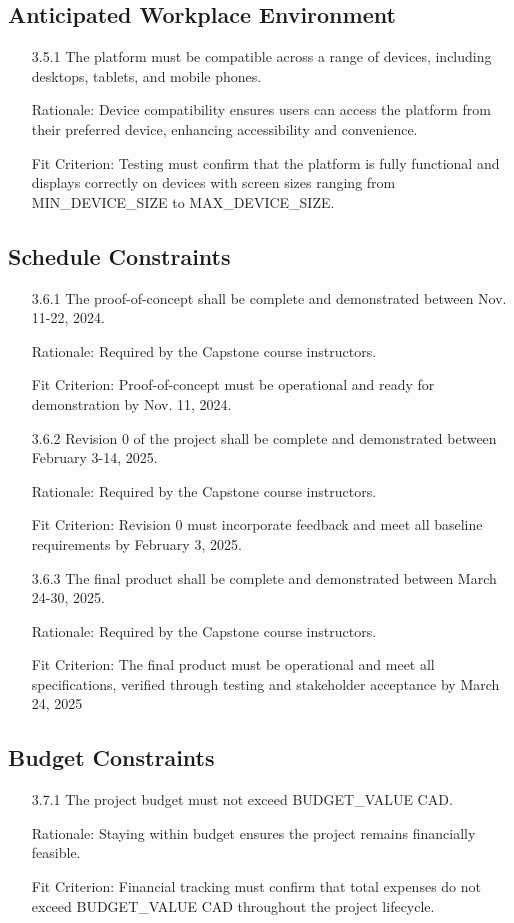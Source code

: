 \documentclass[12pt]{article}
\begin{document}
\subsection{Anticipated Workplace Environment}
\begin{itemize}
  \item[3.5.1] The platform must be compatible across a range of devices, including desktops, tablets, and mobile phones.
  \item[] Rationale: Device compatibility ensures users can access the platform from their preferred device, enhancing accessibility and convenience.
  \item[] Fit Criterion: Testing must confirm that the platform is fully functional and displays correctly on devices with screen sizes ranging from MIN\_DEVICE\_SIZE to MAX\_DEVICE\_SIZE.
\end{itemize}
\subsection{Schedule Constraints}
\begin{itemize}
  \item[3.6.1] The proof-of-concept shall be complete and demonstrated between Nov. 11-22, 2024.
  \item[] Rationale: Required by the Capstone course instructors.
  \item[] Fit Criterion: Proof-of-concept must be operational and ready for demonstration by Nov. 11, 2024.
  \item[3.6.2] Revision 0 of the project shall be complete and demonstrated between February 3-14, 2025.
  \item[] Rationale: Required by the Capstone course instructors.
  \item[] Fit Criterion:  Revision 0 must incorporate feedback and meet all baseline requirements by February 3, 2025.
  \item[3.6.3] The final product shall be complete and demonstrated between March 24-30, 2025.
  \item[] Rationale: Required by the Capstone course instructors.
  \item[] Fit Criterion: The final product must be operational and meet all specifications, verified through testing and stakeholder acceptance by March 24, 2025
\end{itemize}
\subsection{Budget Constraints}
\begin{itemize}
  \item[3.7.1] The project budget must not exceed BUDGET\_VALUE CAD. 
  \item[] Rationale: Staying within budget ensures the project remains financially feasible.
  \item[] Fit Criterion: Financial tracking must confirm that total expenses do not exceed BUDGET\_VALUE CAD throughout the project lifecycle.
\end{itemize}
\end{document}

